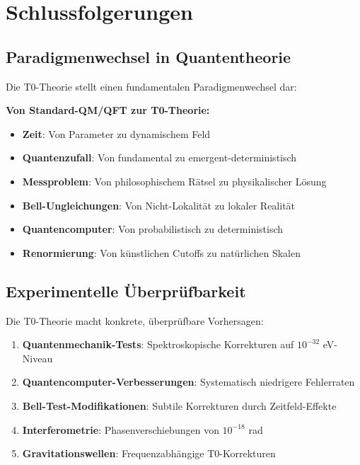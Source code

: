 \documentclass[12pt,a4paper]{article}
\begin{document}
	\section{Schlussfolgerungen}
	
	\subsection{Paradigmenwechsel in Quantentheorie}
	
	Die T0-Theorie stellt einen fundamentalen Paradigmenwechsel dar:
	
	\begin{tcolorbox}[colback=green!5!white,colframe=green!75!black,title=T0-Revolution]
		\textbf{Von Standard-QM/QFT zur T0-Theorie:}
		
		\begin{itemize}
			\item \textbf{Zeit}: Von Parameter zu dynamischem Feld
			\item \textbf{Quantenzufall}: Von fundamental zu emergent-deterministisch
			\item \textbf{Messproblem}: Von philosophischem Rätsel zu physikalischer Lösung
			\item \textbf{Bell-Ungleichungen}: Von Nicht-Lokalität zu lokaler Realität
			\item \textbf{Quantencomputer}: Von probabilistisch zu deterministisch
			\item \textbf{Renormierung}: Von künstlichen Cutoffs zu natürlichen Skalen
		\end{itemize}
	\end{tcolorbox}
	
	\subsection{Experimentelle Überprüfbarkeit}
	
	Die T0-Theorie macht konkrete, überprüfbare Vorhersagen:
	
	\begin{enumerate}
		\item \textbf{Quantenmechanik-Tests}: Spektroskopische Korrekturen auf $10^{-32}$ eV-Niveau
		\item \textbf{Quantencomputer-Verbesserungen}: Systematisch niedrigere Fehlerraten
		\item \textbf{Bell-Test-Modifikationen}: Subtile Korrekturen durch Zeitfeld-Effekte
		\item \textbf{Interferometrie}: Phasenverschiebungen von $10^{-18}$ rad
		\item \textbf{Gravitationswellen}: Frequenzabhängige T0-Korrekturen
	\end{enumerate}
	
\end{document}
